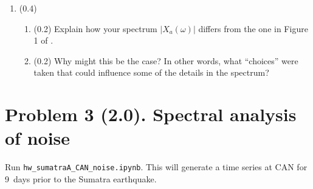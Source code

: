 \documentclass[11pt,titlepage,fleqn]{article}
\newcommand{\tfilenoise}{{\tt hw\_sumatraA\_CAN\_noise.ipynb}}
\begin{document}
\begin{enumerate}

\item (0.4) \ptag\ 
%
\begin{enumerate}
\item (0.2) Explain how your spectrum $|X_a(\omega)|$ differs from the one in Figure 1 of \citet{Park2005}.
\item (0.2) Why might this be the case? In other words, what ``choices'' were taken that could influence some of the details in the spectrum?
\end{enumerate}

\end{enumerate}


\pagebreak
\section*{Problem 3 (2.0). Spectral analysis of noise}

Run \tfilenoise. This will generate a time series at CAN for 9~days prior to the Sumatra earthquake.
\end{document}
